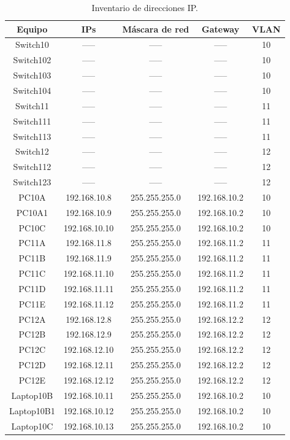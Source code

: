 \documentclass[spanish,12pt,letterpaper]{article}
\begin{document}
\begin{table}[H]
  \centering
  \begin{tabular}{| c | c | c | c | c |}\hline
    Equipo & IPs & Máscara de red & Gateway & VLAN \\ \hline
    Switch10 & -----  & ----- & ----- & 10 \\ \hline 
    Switch102& -----  & ----- & ----- & 10 \\ \hline
    Switch103& -----  & ----- & ----- & 10 \\ \hline
    Switch104& -----  & ----- & ----- & 10 \\ \hline
    Switch11 & -----  & ----- & ----- & 11 \\ \hline
    Switch111& -----  & ----- & ----- & 11 \\ \hline
    Switch113& -----  & ----- & ----- & 11 \\ \hline
    Switch12 & -----  & ----- & ----- & 12 \\ \hline
    Switch112& -----  & ----- & ----- & 12 \\ \hline
    Switch123& -----  & ----- & ----- & 12 \\ \hline
    PC10A  & 192.168.10.8  & 255.255.255.0 & 192.168.10.2 & 10  \\ \hline
    PC10A1 & 192.168.10.9  & 255.255.255.0 & 192.168.10.2 & 10 \\ \hline
    PC10C  & 192.168.10.10 & 255.255.255.0 & 192.168.10.2 & 10 \\ \hline
    PC11A  & 192.168.11.8  & 255.255.255.0 & 192.168.11.2 & 11 \\ \hline
    PC11B  & 192.168.11.9  & 255.255.255.0 & 192.168.11.2 & 11 \\ \hline
    PC11C  & 192.168.11.10 & 255.255.255.0 & 192.168.11.2 & 11 \\ \hline
    PC11D  & 192.168.11.11 & 255.255.255.0 & 192.168.11.2 & 11 \\ \hline
    PC11E  & 192.168.11.12 & 255.255.255.0 & 192.168.11.2 & 11 \\ \hline
    PC12A  & 192.168.12.8  & 255.255.255.0 & 192.168.12.2 & 12 \\ \hline
    PC12B  & 192.168.12.9  & 255.255.255.0 & 192.168.12.2 & 12 \\ \hline
    PC12C  & 192.168.12.10 & 255.255.255.0 & 192.168.12.2 & 12 \\ \hline
    PC12D  & 192.168.12.11 & 255.255.255.0 & 192.168.12.2 & 12 \\ \hline
    PC12E  & 192.168.12.12 & 255.255.255.0 & 192.168.12.2 & 12 \\ \hline
    Laptop10B  & 192.168.10.11 & 255.255.255.0 & 192.168.10.2 & 10 \\ \hline
    Laptop10B1  & 192.168.10.12 & 255.255.255.0 & 192.168.10.2 & 10 \\ \hline
    Laptop10C  & 192.168.10.13 & 255.255.255.0 & 192.168.10.2 & 10 \\ \hline
  \end{tabular}
  \caption{Inventario de direcciones IP.}
\end{table}
\end{document}
